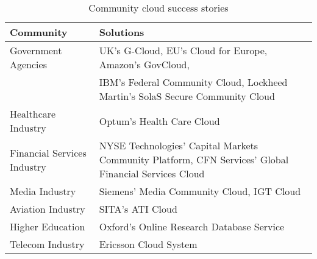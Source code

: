 \begin{table}[tbp]
    \renewcommand{\arraystretch}{1.3}
    \caption{Community cloud success stories}
    \label{tab__cloud_users}
    \centering
    \footnotesize
    
    \begin{tabular}{@{} l  l @{}}
    \hline
    Community	    & Solutions \\ \hline
    
    Government Agencies	&   UK's G-Cloud, EU's Cloud for Europe, Amazon's GovCloud, \\
    							& IBM's Federal Community Cloud,  Lockheed Martin's SolaS Secure Community Cloud    \\
    Healthcare Industry	&	Optum's Health Care Cloud	\\
    Financial Services Industry	&	NYSE Technologies' Capital Markets Community Platform, CFN Services' Global Financial Services Cloud \\
    Media Industry	&	Siemens' Media Community Cloud, IGT Cloud	\\
    Aviation Industry	&	SITA's ATI Cloud	\\
    Higher Education	&	Oxford's Online Research Database Service \\
    Telecom Industry	&	Ericsson Cloud System \\
    \hline
    \end{tabular}
\end{table}
